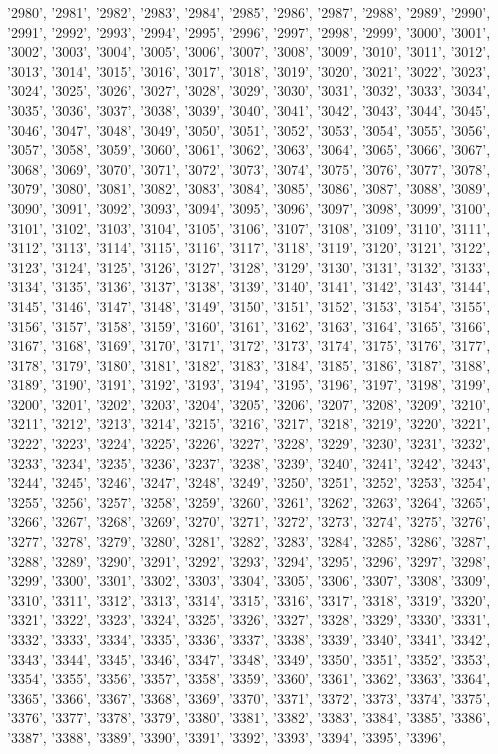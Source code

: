 '2980', '2981', '2982', '2983', '2984', '2985', '2986', '2987', '2988', '2989', '2990', '2991', '2992', '2993', '2994', '2995', '2996', '2997', '2998', '2999', '3000', '3001', '3002', '3003', '3004', '3005', '3006', '3007', '3008', '3009', '3010', '3011', '3012', '3013', '3014', '3015', '3016', '3017', '3018', '3019', '3020', '3021', '3022', '3023', '3024', '3025', '3026', '3027', '3028', '3029', '3030', '3031', '3032', '3033', '3034', '3035', '3036', '3037', '3038', '3039', '3040', '3041', '3042', '3043', '3044', '3045', '3046', '3047', '3048', '3049', '3050', '3051', '3052', '3053', '3054', '3055', '3056', '3057', '3058', '3059', '3060', '3061', '3062', '3063', '3064', '3065', '3066', '3067', '3068', '3069', '3070', '3071', '3072', '3073', '3074', '3075', '3076', '3077', '3078', '3079', '3080', '3081', '3082', '3083', '3084', '3085', '3086', '3087', '3088', '3089', '3090', '3091', '3092', '3093', '3094', '3095', '3096', '3097', '3098', '3099', '3100', '3101', '3102', '3103', '3104', '3105', '3106', '3107', '3108', '3109', '3110', '3111', '3112', '3113', '3114', '3115', '3116', '3117', '3118', '3119', '3120', '3121', '3122', '3123', '3124', '3125', '3126', '3127', '3128', '3129', '3130', '3131', '3132', '3133', '3134', '3135', '3136', '3137', '3138', '3139', '3140', '3141', '3142', '3143', '3144', '3145', '3146', '3147', '3148', '3149', '3150', '3151', '3152', '3153', '3154', '3155', '3156', '3157', '3158', '3159', '3160', '3161', '3162', '3163', '3164', '3165', '3166', '3167', '3168', '3169', '3170', '3171', '3172', '3173', '3174', '3175', '3176', '3177', '3178', '3179', '3180', '3181', '3182', '3183', '3184', '3185', '3186', '3187', '3188', '3189', '3190', '3191', '3192', '3193', '3194', '3195', '3196', '3197', '3198', '3199', '3200', '3201', '3202', '3203', '3204', '3205', '3206', '3207', '3208', '3209', '3210', '3211', '3212', '3213', '3214', '3215', '3216', '3217', '3218', '3219', '3220', '3221', '3222', '3223', '3224', '3225', '3226', '3227', '3228', '3229', '3230', '3231', '3232', '3233', '3234', '3235', '3236', '3237', '3238', '3239', '3240', '3241', '3242', '3243', '3244', '3245', '3246', '3247', '3248', '3249', '3250', '3251', '3252', '3253', '3254', '3255', '3256', '3257', '3258', '3259', '3260', '3261', '3262', '3263', '3264', '3265', '3266', '3267', '3268', '3269', '3270', '3271', '3272', '3273', '3274', '3275', '3276', '3277', '3278', '3279', '3280', '3281', '3282', '3283', '3284', '3285', '3286', '3287', '3288', '3289', '3290', '3291', '3292', '3293', '3294', '3295', '3296', '3297', '3298', '3299', '3300', '3301', '3302', '3303', '3304', '3305', '3306', '3307', '3308', '3309', '3310', '3311', '3312', '3313', '3314', '3315', '3316', '3317', '3318', '3319', '3320', '3321', '3322', '3323', '3324', '3325', '3326', '3327', '3328', '3329', '3330', '3331', '3332', '3333', '3334', '3335', '3336', '3337', '3338', '3339', '3340', '3341', '3342', '3343', '3344', '3345', '3346', '3347', '3348', '3349', '3350', '3351', '3352', '3353', '3354', '3355', '3356', '3357', '3358', '3359', '3360', '3361', '3362', '3363', '3364', '3365', '3366', '3367', '3368', '3369', '3370', '3371', '3372', '3373', '3374', '3375', '3376', '3377', '3378', '3379', '3380', '3381', '3382', '3383', '3384', '3385', '3386', '3387', '3388', '3389', '3390', '3391', '3392', '3393', '3394', '3395', '3396', 